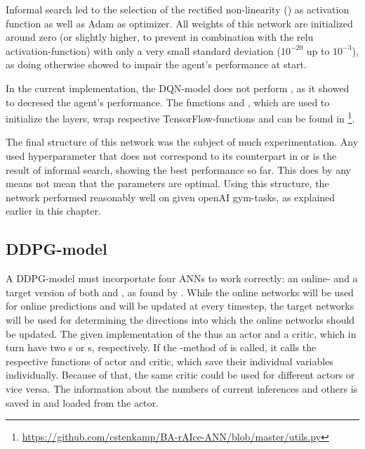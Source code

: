 Informal search led to the selection of the rectified non-linearity () as activation function as well as Adam\cite{kingma_adam:_2014} as optimizer. All weights of this network are initialized around zero (or slightly higher, to prevent  in combination with the relu activation-function) with only a very small standard deviation ($10^{-20}$ up to $10^{-3}$), as doing otherwise showed to impair the agent's performance at start.

In the current implementation, the DQN-model does not perform \cite{ioffe_batch_2015}, as it showed to decresed the agent's performance. The functions  and , which are used to initialize the layers, wrap respective TensorFlow-functions and can be found in \footnote{\url{https://github.com/cstenkamp/BA-rAIce-ANN/blob/master/utils.py}}.

The final structure of this network was the subject of much experimentation. Any used hyperparameter that does not correspond to its counterpart in \cite{mnih_human-level_2015} or \cite{wang_dueling_2015} is the result of informal search, showing the best performance so far. This does by any means not mean that the parameters are optimal. Using this structure, the network performed reasonably well on given openAI gym-tasks, as explained earlier in this chapter.


\subsection{DDPG-model}

A DDPG-model must incorportate four ANNs to work correctly: an online- and a target version of both  and , as found by \cite{lillicrap_continuous_2015}.  While the online networks will be used for online predictions and will be updated at every timestep, the target networks will be used for determining the directions into which the online networks should be updated. The given implementation of the  thus  an actor and a critic, which in turn have two s or s, respectively. If the -method of  is called, it calls the respective functions of actor and critic, which save their individual variables individually. Because of that, the same critic could be used for different actors or vice versa. The information about the numbers of current inferences and others is saved in and loaded from the actor.


